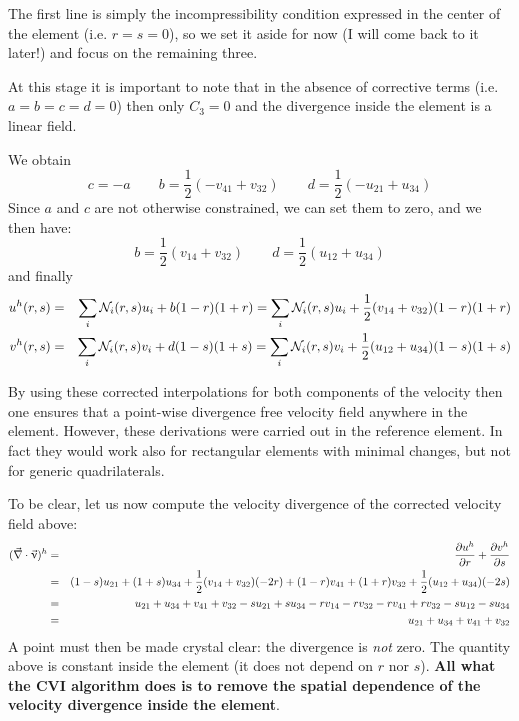 The first line is simply the incompressibility condition
expressed in the center of the element (i.e. $r=s=0$),
so we set it aside for now (I will come back to it later!)
and focus on the remaining three.

At this stage it is important to note that in the absence of corrective terms (i.e. $a=b=c=d=0$)
then only $C_3=0$ and the divergence inside the element is a linear field.

We obtain
\[
c=-a
\qquad
b=\frac{1}{2}(-v_{41} + v_{32})
\qquad
d=\frac{1}{2} (-u_{21} + u_{34})
\]
Since $a$ and $c$ are not otherwise constrained, we can set them to zero, and we then have:
\[
b=\frac{1}{2}(v_{14} + v_{32})
\quad\quad
d=\frac{1}{2} (u_{12} + u_{34})
\]
and finally
\begin{eqnarray}
u^h(r,s)
&=&\sum_i {\mathcal{N}}_i(r,s) u_i + b(1-r)(1+r) 
=\sum_i {\mathcal{N}}_i(r,s) u_i + \frac{1}{2}(v_{14} + v_{32})(1-r)(1+r) \nonumber\\
v^h(r,s)
&=&\sum_i {\mathcal{N}}_i(r,s) v_i + d(1-s)(1+s) 
=\sum_i {\mathcal{N}}_i(r,s) v_i + \frac{1}{2} (u_{12} + u_{34})(1-s)(1+s) \nonumber
\end{eqnarray}

By using these corrected interpolations for both components 
of the velocity then one ensures that a point-wise divergence free
velocity field anywhere in the element.
However, these derivations were carried out in the reference element. 
In fact they would work also for rectangular elements with minimal 
changes, but not for generic quadrilaterals.

To be clear, let us now compute the velocity divergence of the corrected 
velocity field above:
\begin{eqnarray}
(\vec\nabla\cdot\vec\upnu)^h 
&=&
\frac{\partial u^h}{\partial r}+
\frac{\partial v^h}{\partial s}
\nonumber\\
&=& (1-s) u_{21} + (1+s) u_{34} +  \frac{1}{2}(v_{14} + v_{32})(-2r)
+ (1-r) v_{41} + (1+r) v_{32}  + \frac{1}{2} (u_{12} + u_{34})(-2s) \nonumber\\
&=& u_{21} + u_{34} + v_{41} + v_{32}
-s u_{21} + s u_{34} -r v_{14} -r v_{32} 
-r v_{41} + r v_{32} -s u_{12} -s u_{34} \nonumber\\
&=& u_{21} + u_{34} + v_{41} + v_{32} 
\end{eqnarray}
A point must then be made crystal clear: the divergence is
{\it not} zero. The quantity above is constant inside the element 
(it does not depend on $r$ nor $s$). 
{\bf All what the CVI algorithm does is to remove the spatial dependence
of the velocity divergence inside the element}.

